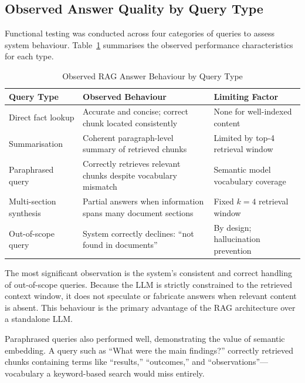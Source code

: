 \subsection{Observed Answer Quality by Query Type}

Functional testing was conducted across four categories of queries to
assess system behaviour. Table~\ref{tab:query_behaviour} summarises the
observed performance characteristics for each type.

\begin{table}[H]
\centering
\caption{Observed RAG Answer Behaviour by Query Type}
\label{tab:query_behaviour}
\renewcommand{\arraystretch}{1.4}
\begin{tabular}{p{3.5cm} p{4.5cm} p{4.5cm}}
\toprule
\textbf{Query Type} & \textbf{Observed Behaviour} & \textbf{Limiting Factor} \\
\midrule
Direct fact lookup
  & Accurate and concise; correct chunk located consistently
  & None for well-indexed content \\
\addlinespace
Summarisation
  & Coherent paragraph-level summary of retrieved chunks
  & Limited by top-4 retrieval window \\
\addlinespace
Paraphrased query
  & Correctly retrieves relevant chunks despite vocabulary mismatch
  & Semantic model vocabulary coverage \\
\addlinespace
Multi-section synthesis
  & Partial answers when information spans many document sections
  & Fixed $k=4$ retrieval window \\
\addlinespace
Out-of-scope query
  & System correctly declines: ``not found in documents''
  & By design; hallucination prevention \\
\bottomrule
\end{tabular}
\end{table}

The most significant observation is the system's consistent and correct
handling of out-of-scope queries. Because the LLM is strictly constrained to
the retrieved context window, it does not speculate or fabricate answers when
relevant content is absent. This behaviour is the primary advantage of the RAG
architecture over a standalone LLM.

Paraphrased queries also performed well, demonstrating the value of semantic
embedding. A query such as ``What were the main findings?'' correctly retrieved
chunks containing terms like ``results,'' ``outcomes,'' and ``observations''---
vocabulary a keyword-based search would miss entirely.

